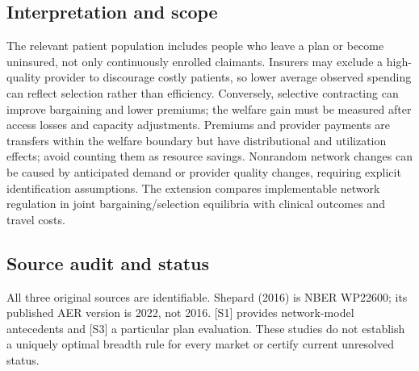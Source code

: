 \documentclass[11pt,a4paper]{article}
\begin{document}
\subsection*{Interpretation and scope}
The relevant patient population includes people who leave a plan or become uninsured, not only continuously enrolled claimants. Insurers may exclude a high-quality provider to discourage costly patients, so lower average observed spending can reflect selection rather than efficiency. Conversely, selective contracting can improve bargaining and lower premiums; the welfare gain must be measured after access losses and capacity adjustments. Premiums and provider payments are transfers within the welfare boundary but have distributional and utilization effects; avoid counting them as resource savings. Nonrandom network changes can be caused by anticipated demand or provider quality changes, requiring explicit identification assumptions. The extension compares implementable network regulation in joint bargaining/selection equilibria with clinical outcomes and travel costs.

\subsection*{Source audit and status}
All three original sources are identifiable. Shepard (2016) is NBER WP22600; its published AER version is 2022, not 2016. [S1] provides network-model antecedents and [S3] a particular plan evaluation. These studies do not establish a uniquely optimal breadth rule for every market or certify current unresolved status.
\end{document}
